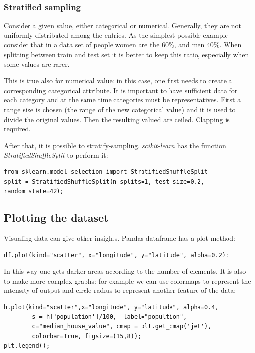 \documentclass[12pt, letterpaper]{article}
\theoremstyle{definition}
\let\ti\textit
\begin{document}
\subsubsection{Stratified sampling}
Consider a given value, either categorical or numerical. Generally, they are not uniformly distributed among the entries. As the simplest possible example consider that in a data set of people women are the $60\%$, and men $40\%$. When splitting between train and test set it is better to keep this ratio, especially when some values are rarer.

This is true also for numerical value: in this case, one first needs to create a corresponding categorical attribute. It is important to have sufficient data for each category and at the same time categories must be representatives. First a range size is chosen (the range of the new categorical value) and it is used to divide the original values. Then the resulting valued are ceiled. Clapping is required.

After that, it is possible to stratify-sampling. \ti{scikit-learn} has the function \ti{StratifiedShuffleSplit} to perform it:
\begin{lstlisting}
from sklearn.model_selection import StratifiedShuffleSplit
split = StratifiedShuffleSplit(n_splits=1, test_size=0.2, random_state=42);
\end{lstlisting}

\subsection{Plotting the dataset}
Visualing data can give other insights.
Pandas dataframe has a plot method:
\begin{lstlisting}[caption=Example of Pandas dataframe plot method.]
df.plot(kind="scatter", x="longitude", y="latitude", alpha=0.2);
\end{lstlisting}
In this way one gets darker areas according to the number of elements.
It is also to make more complex graphs: for example we can use colormaps to represent the intensity of output and circle radius to represent another feature of the data:
\begin{lstlisting}[caption=Example of Pandas dataframe plot with colormap and variable radius of scattered circles.]
h.plot(kind="scatter",x="longitude", y="latitude", alpha=0.4, 
		s = h['population']/100,  label="popultion", 
		c="median_house_value", cmap = plt.get_cmap('jet'), 
		colorbar=True, figsize=(15,8));
plt.legend();
\end{lstlisting}
\end{document}
